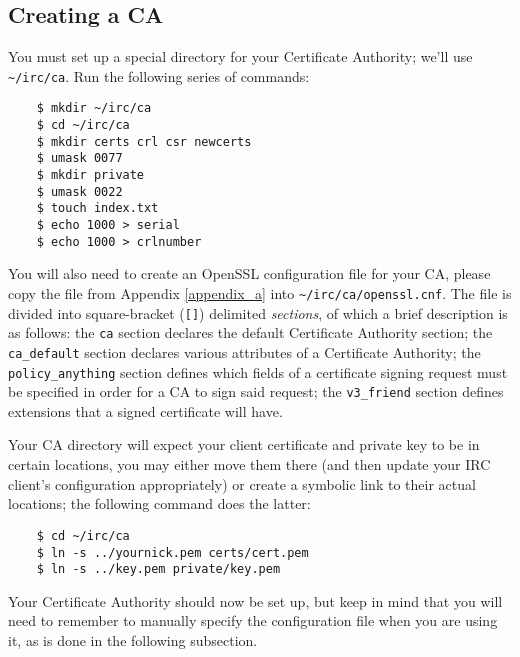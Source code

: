 \documentclass{article}
\begin{document}
{\subsection{Creating a CA}
You must set up a special directory for your Certificate Authority; we'll use \texttt{\textasciitilde /irc/ca}.  Run the following series of commands:
\begin{lstlisting}
    $ mkdir ~/irc/ca
    $ cd ~/irc/ca
    $ mkdir certs crl csr newcerts
    $ umask 0077
    $ mkdir private
    $ umask 0022
    $ touch index.txt
    $ echo 1000 > serial
    $ echo 1000 > crlnumber
\end{lstlisting}
You will also need to create an OpenSSL configuration file for your CA, please copy the file from Appendix \ref{appendix_a} into \texttt{\textasciitilde /irc/ca/openssl.cnf}.  The file is divided into square-bracket (\texttt{[]}) delimited \textit{sections}, of which a brief description is as follows: the \texttt{ca} section declares the default Certificate Authority section; the \texttt{ca\_default} section declares various attributes of a Certificate Authority; the \texttt{policy\_anything} section defines which fields of a certificate signing request must be specified in order for a CA to sign said request;  the \texttt{v3\_friend} section defines extensions that a signed certificate will have.

Your CA directory will expect your client certificate and private key to be in certain locations, you may either move them there (and then update your IRC client's configuration appropriately) or create a symbolic link to their actual locations; the following command does the latter:
\begin{lstlisting}
    $ cd ~/irc/ca
    $ ln -s ../yournick.pem certs/cert.pem
    $ ln -s ../key.pem private/key.pem
\end{lstlisting}
Your Certificate Authority should now be set up, but keep in mind that you will need to remember to manually specify the configuration file when you are using it, as is done in the following subsection.

}
\end{document}

